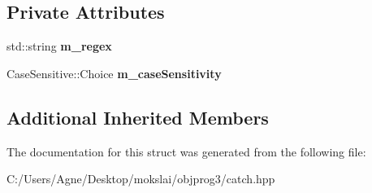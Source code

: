 \subsection*{Private Attributes}
\begin{DoxyCompactItemize}
\item 
\mbox{\label{struct_catch_1_1_matchers_1_1_std_string_1_1_regex_matcher_af1020e7266bcfa76ffad011ff89ea14e}} 
std\+::string {\bfseries m\+\_\+regex}
\item 
\mbox{\label{struct_catch_1_1_matchers_1_1_std_string_1_1_regex_matcher_afb5fb3d3734c4e882162b51559d09bd4}} 
Case\+Sensitive\+::\+Choice {\bfseries m\+\_\+case\+Sensitivity}
\end{DoxyCompactItemize}
\subsection*{Additional Inherited Members}


The documentation for this struct was generated from the following file\+:\begin{DoxyCompactItemize}
\item 
C\+:/\+Users/\+Agne/\+Desktop/mokslai/objprog3/catch.\+hpp\end{DoxyCompactItemize}
